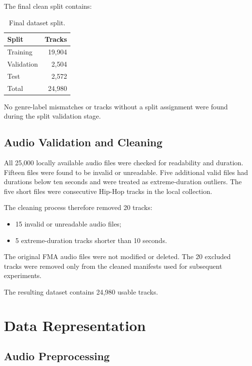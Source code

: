 \documentclass[11pt,a4paper]{article}
\begin{document}
The final clean split contains:

\begin{table}[H]
\centering
\caption{Final dataset split.}
\label{tab:splits}
\begin{tabular}{lr}
\toprule
Split & Tracks\\
\midrule
Training & 19,904\\
Validation & 2,504\\
Test & 2,572\\
\midrule
Total & 24,980\\
\bottomrule
\end{tabular}
\end{table}

No genre-label mismatches or tracks without a split assignment were found during the split validation stage.

\subsection{Audio Validation and Cleaning}

All 25,000 locally available audio files were checked for readability and duration. Fifteen files were found to be invalid or unreadable. Five additional valid files had durations below ten seconds and were treated as extreme-duration outliers. The five short files were consecutive Hip-Hop tracks in the local collection.

The cleaning process therefore removed 20 tracks:

\begin{itemize}
    \item 15 invalid or unreadable audio files;
    \item 5 extreme-duration tracks shorter than 10 seconds.
\end{itemize}

The original FMA audio files were not modified or deleted. The 20 excluded tracks were removed only from the cleaned manifests used for subsequent experiments.

The resulting dataset contains 24,980 usable tracks.

\section{Data Representation}

\subsection{Audio Preprocessing}
\end{document}
